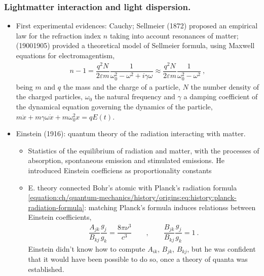 \documentclass[letterpaper,10pt,english]{jupyterBook}
\begin{document}
\subsubsection*{Light\sphinxhyphen{}matter interaction and light dispersion.}
\begin{itemize}
\item {} 
\sphinxAtStartPar
First experimental evidences: Cauchy; Sellmeier (1872) proposed an empirical law for the refraction index \(n\) taking into account resonances of matter; {\hyperref[\detokenize{ch/quantum-mechanics/history/light-dispersion:quantum-mechanics-history-dispersion-classical-drude-lorentz}]{}} (1900\sphinxhyphen{}1905) provided a theoretical model of Sellmeier formula, using Maxwell equations for electromagentism,
\begin{equation}\label{equation:ch/quantum-mechanics/history/origins:eq:history:lorenz-drude}
\begin{split}n - 1 = \dfrac{q^2 N}{2 \varepsilon m} \dfrac{1}{\omega_0^2 - \omega^2 + i \gamma \omega} \approx \dfrac{q^2 N}{2 \varepsilon m} \dfrac{1}{\omega_0^2 - \omega^2}  \ ,\end{split}
\end{equation}
\sphinxAtStartPar
being \(m\) and \(q\) the mass and the charge of a particle, \(N\) the number density of the charged particles, \(\omega_0\) the natural frequency and \(\gamma\) a damping coefficient of the dynamical equation governing the dynamics of the particle, \(m \ddot{x} + m \gamma \omega \dot{x} + m \omega_0^2 x = q E(t)\).

\item {} 
\sphinxAtStartPar
Einstein (1916): quantum theory of the radiation interacting with matter.
\begin{itemize}
\item {} 
\sphinxAtStartPar
Statistics of the equilibrium of radiation and matter, with the processes of absorption, spontaneous emission and stimulated emissions. He introduced Einstein coefficiens as proportionality constants

\item {} 
\sphinxAtStartPar
E. theory connected Bohr’s atomic with Planck’s radiation formula \eqref{equation:ch/quantum-mechanics/history/origins:eq:history:planck-radiation-formula}: matching Planck’s formula induces relationss between Einstein coefficients,
\begin{equation*}
\begin{split}
    \dfrac{A_{jk}}{B_{kj}} \dfrac{g_j}{g_k} = \dfrac{8 \pi \nu^3}{c^3}
    \qquad , \qquad                        
    \dfrac{B_{jk}}{B_{kj}} \dfrac{g_j}{g_k} = 1 \ .
    \end{split}
\end{equation*}
\sphinxAtStartPar
Einstein didn’t know how to compute \(A_{ik}\), \(B_{jk}\), \(B_{kj}\), but he was confident that it would have been possible to do so, once a theory of quanta was established.


\end{itemize}
\end{itemize}
\end{document}
